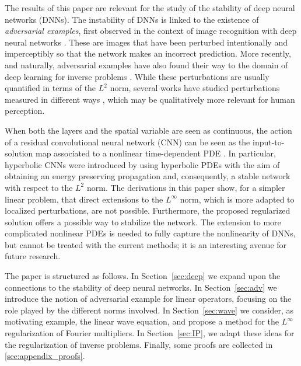 \documentclass{article}
\theoremstyle{definition}
\begin{document}
The results of this paper are relevant for the study of the stability of deep neural networks (DNNs). The instability of DNNs is linked to the existence of \emph{adversarial examples}, first observed in the context of image recognition with deep neural networks \cite{biggio2013evasion,szegedy2013intriguing,goodfellow2014explaining,moosavi2016deepfool,madry2017towards,carlini2017towards}.
These are images that have been perturbed intentionally and imperceptibly so that the network makes an incorrect prediction.
More recently, and naturally, adversarial examples have also found their way to the domain of deep learning for inverse problems \cite{antun2020instabilities,genzel2020solving,gottschling2020troublesome}.
While  these perturbations are usually quantified in terms of the $L^2$ norm, several works have studied perturbations measured in different ways \cite{xiao2018spatially,alaifari2019adef,alaifari2023localized}, which may be qualitatively more relevant for human perception.

When both the layers and the spatial variable are seen as continuous, the action of a residual convolutional neural network (CNN) can be seen as the input-to-solution map associated to a nonlinear time-dependent PDE \cite{haber-ruthotto-2020}. In particular, hyperbolic CNNs were introduced by using hyperbolic PDEs with the aim of obtaining an energy preserving propagation and, consequently, a stable network with respect to the $L^2$ norm. The derivations in this paper show, for a simpler linear problem, that direct extensions to the $L^\infty$ norm, which is more adapted to localized perturbations, are not possible. Furthermore, the proposed regularized solution offers a possible way to stabilize the network. The extension to more complicated nonlinear PDEs is needed to fully capture the nonlinearity of DNNs, but cannot be treated with the current methods; it is an interesting avenue for future research.

The paper is structured as follows. In Section~\ref{sec:deep} we expand upon the connections to the stability of deep neural networks. In Section~\ref{sec:adv} we introduce the notion of adversarial example for linear operators, focusing on the role played by the different norms involved. In Section~\ref{sec:wave} we consider, as motivating example, the linear wave equation, and propose a method for the $L^\infty$ regularization of Fourier multipliers. In Section~\ref{sec:IP}, we adapt these ideas for the regularization of inverse problems. Finally, some proofs are collected in \ref{sec:appendix_proofs}.
\end{document}
